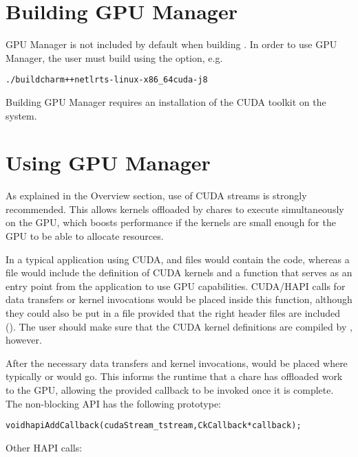 \section{Building GPU Manager}

GPU Manager is not included by default when building \charmpp{}. In order to use
GPU Manager, the user must build \charmpp{} using the \cuda{} option, e.g.

\begin{alltt}
./build charm++ netlrts-linux-x86_64 cuda -j8
\end{alltt}

Building GPU Manager requires an installation of the CUDA toolkit on the system.

\section{Using GPU Manager}

As explained in the Overview section, use of CUDA streams is strongly recommended.
This allows kernels offloaded by chares to execute simultaneously on the GPU,
which boosts performance if the kernels are small enough for the GPU to be able
to allocate resources.

In a typical \charmpp{} application using CUDA,  and  files
would contain the \charmpp{} code, whereas a  file would include the
definition of CUDA kernels and a function that serves as an entry point from
the \charmpp{} application to use GPU capabilities. CUDA/HAPI calls for data
transfers or kernel invocations would be placed inside this function, although
they could also be put in a  file provided that the right header files
are included (). The user should make sure
that the CUDA kernel definitions are compiled by , however.

After the necessary data transfers and kernel invocations, 
would be placed where typically  or
 would go. This informs the runtime that a chare has
offloaded work to the GPU, allowing the provided \charmpp{} callback to be
invoked once it is complete. The non-blocking API has the following prototype:

\begin{alltt}
  void hapiAddCallback(cudaStream_t stream, CkCallback* callback);
\end{alltt}

Other HAPI calls:

